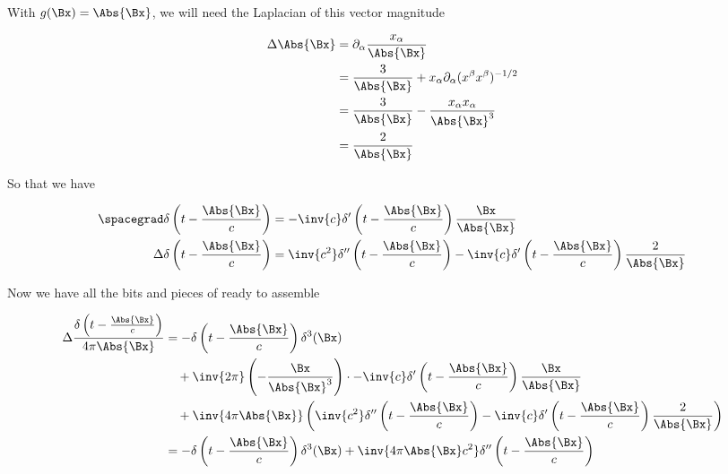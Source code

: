 With $g(\Bx) = \Abs{\Bx}$, we will need the Laplacian of this vector magnitude

\begin{equation}\label{eqn:relativisticElectrodynamicsL18:900}
\begin{aligned}
\Delta \Abs{\Bx}
&=
\partial_\alpha \frac{x_\alpha}{\Abs{\Bx}} \\
&=
\frac{3}{\Abs{\Bx}} 
+ x_\alpha \partial_\alpha (x^\beta x^\beta)^{-1/2} \\
&=
\frac{3}{\Abs{\Bx}} 
- \frac{x_\alpha x_\alpha}{\Abs{\Bx}^3} \\
&= \frac{2}{\Abs{\Bx}} 
\end{aligned}
\end{equation}

So that we have

\begin{equation}\label{eqn:relativisticElectrodynamicsL18:440}
\begin{aligned}
\spacegrad \delta\left(t - \frac{\Abs{\Bx}}{c}\right) &= 
-\inv{c} \delta'\left(t - \frac{\Abs{\Bx}}{c}\right) \frac{\Bx}{\Abs{\Bx}} \\
\Delta \delta\left(t - \frac{\Abs{\Bx}}{c}\right) &=
\inv{c^2} \delta''\left(t - \frac{\Abs{\Bx}}{c}\right) -\inv{c} \delta'\left(t - \frac{\Abs{\Bx}}{c}\right) \frac{2}{\Abs{\Bx}} 
\end{aligned}
\end{equation}

Now we have all the bits and pieces of  ready to assemble

\begin{equation}\label{eqn:relativisticElectrodynamicsL18:920}
\begin{aligned}
\Delta \frac{\delta\left(t - \frac{\Abs{\Bx}}{c}\right)}{4 \pi \Abs{\Bx} }
&=
-\delta\left(t - \frac{\Abs{\Bx}}{c}\right) \delta^3(\Bx) \\
&\quad +\inv{2\pi} \left( - \frac{\Bx}{\Abs{\Bx}^3} \right)
\cdot
-\inv{c} \delta'\left(t - \frac{\Abs{\Bx}}{c}\right) \frac{\Bx}{\Abs{\Bx}} \\
&\quad +
\inv{4 \pi \Abs{\Bx} }
\left(
\inv{c^2} \delta''\left(t - \frac{\Abs{\Bx}}{c}\right) -\inv{c} \delta'\left(t - \frac{\Abs{\Bx}}{c}\right) \frac{2}{\Abs{\Bx}} \right) \\
&=
-\delta\left(t - \frac{\Abs{\Bx}}{c}\right) \delta^3(\Bx) 
+\inv{4 \pi \Abs{\Bx} c^2 }
\delta''\left(t - \frac{\Abs{\Bx}}{c}\right) 
\end{aligned}
\end{equation}

